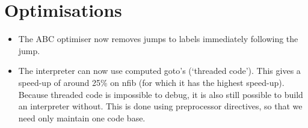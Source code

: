 \documentclass[a4paper]{article}
\begin{document}
\section*{Optimisations}
\begin{itemize}
	\item
		The ABC optimiser now removes jumps to labels immediately following the jump.

	\item
		The interpreter can now use computed goto's (`threaded code').
		This gives a speed-up of around 25\% on nfib (for which it has the highest speed-up).
		Because threaded code is impossible to debug, it is also still possible to build an interpreter without.
		This is done using preprocessor directives, so that we need only maintain one code base.
\end{itemize}
\end{document}
